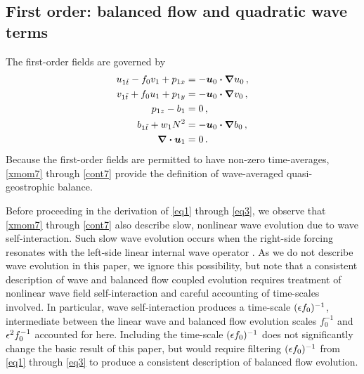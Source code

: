 \documentclass[12pt, oneside]{book}
\begin{document}
\subsection{First order: balanced  flow and quadratic wave terms}
\label{o1}
 
The first-order fields are governed by
\begin{align}
u_{1\tilde t} - f_0 v_1 + p_{1x} &= -  \boldsymbol u_0 \boldsymbol \cdot \boldsymbol \nabla  u_0 \, , \label{xmom7} \\
v_{1 \tilde t} + f_0 u_1 + p_{1y} &= - \boldsymbol u_0 \boldsymbol \cdot \boldsymbol \nabla  v_0 \, , \label{ymom7} \\
p_{1z} -b_1 &=  0 \, , \\
b_{1 \tilde t} + w_1 N^2 &= -  \boldsymbol u_0 \boldsymbol \cdot \boldsymbol \nabla  b_0 \, , \label{bmom7} \\
\boldsymbol \nabla \boldsymbol \cdot \boldsymbol u_1 &= 0  \, . \label{cont7}
\end{align}
Because the first-order fields are permitted to have non-zero time-averages, \eqref{xmom7} through \eqref{cont7} provide the definition of wave-averaged quasi-geostrophic balance.  

Before proceeding in the derivation of \eqref{eq1} through \eqref{eq3}, we observe that \eqref{xmom7} through \eqref{cont7} also describe slow, nonlinear wave evolution due to wave self-interaction.  Such slow wave evolution occurs when the right-side forcing resonates with the left-side linear internal wave operator \citep{muller1986nonlinear}.  As we do not describe wave evolution in this paper, we ignore this possibility, but note that a consistent description of wave and balanced flow coupled evolution requires treatment of nonlinear wave field self-interaction and careful accounting of time-scales involved.  In particular, wave self-interaction produces a time-scale $(\epsilon f_0)^{-1}$, intermediate between the linear wave and balanced flow evolution scales $f_0^{-1}$ and $\epsilon^2 f_0^{-1}$ accounted for here.  Including the time-scale $(\epsilon f_0)^{-1}$ does not significantly change the basic result of this paper, but would require filtering $(\epsilon f_0)^{-1}$ from \eqref{eq1} through \eqref{eq3} to produce a consistent description of balanced flow evolution.


\end{document}

